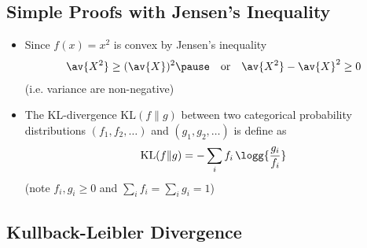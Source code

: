 
\begin{slide}
\section{Simple Proofs with Jensen's Inequality}

\begin{PauseHighLight}
  \begin{itemize}
  \item Since $f(x) = x^2$ is convex by Jensen's inequality
    \begin{align*}
      \av{X^2} \geq  (\av{X})^2\pause \quad \text{or} \quad
      \av{X^2}-\av{X}^2 \geq 0
    \end{align*}
    (i.e. variance are non-negative)\pause
  \item The KL-divergence $\mathrm{KL}(f \| g)$ between two
    categorical probability distributions $(f_1,f_2,\ldots)$ and
    $(g_1,g_2,\ldots)$ is define as
    \begin{align*}
      \mathrm{KL}(f \| g) = - \sum_i f_i \, \logg{\frac{g_i}{f_i}}
    \end{align*}
    (note $f_i,g_i\geq 0$ and $\sum\limits_i f_i = \sum\limits_i g_i
    =1 $)\pause
  \end{itemize}
\end{PauseHighLight}

\end{slide}


\begin{slide}
\section[-2]{Kullback-Leibler Divergence}

\pb\pause{}
\begin{center}
  \pause
\end{center}
\end{slide}



